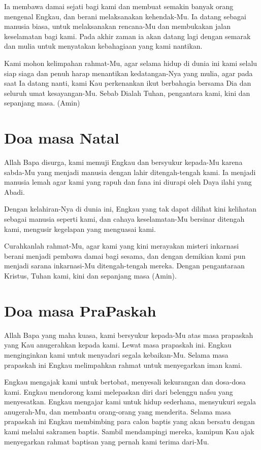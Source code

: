 Ia membawa damai sejati bagi kami dan membuat semakin banyak orang
mengenal Engkau, dan berani melaksanakan kehendak-Mu. Ia datang sebagai
manusia biasa, untuk melaksanakan rencana-Mu dan membukakan jalan
keselamatan bagi kami. Pada akhir zaman ia akan datang lagi dengan
semarak dan mulia untuk menyatakan kebahagiaan yang kami nantikan.

Kami mohon kelimpahan rahmat-Mu, agar selama hidup di dunia ini kami
selalu siap siaga dan penuh harap menantikan kedatangan-Nya yang mulia,
agar pada saat Ia datang nanti, kami Kau perkenankan ikut berbahagia
bersama Dia dan seluruh umat kesayangan-Mu. Sebab Dialah Tuhan,
pengantara kami, kini dan sepanjang masa. (Amin)

\section[Doa masa Natal]{Doa masa Natal}
Allah Bapa disurga, kami memuji Engkau dan bersyukur kepada-Mu karena
sabda-Mu yang menjadi manusia dengan lahir ditengah-tengah kami. Ia
menjadi manusia lemah agar kami yang rapuh dan fana ini diurapi oleh
Daya ilahi yang Abadi.

Dengan kelahiran-Nya di dunia ini, Engkau yang tak dapat dilihat kini
kelihatan sebagai manusia seperti kami, dan cahaya keselamatan-Mu
bersinar ditengah kami, mengusir kegelapan yang menguasai kami.

Curahkanlah rahmat-Mu, agar kami yang kini merayakan misteri inkarnasi
berani menjadi pembawa damai bagi sesama, dan dengan demikian kami pun
menjadi sarana inkarnasi-Mu ditengah-tengah mereka. Dengan pengantaraan
Kristus, Tuhan kami, kini dan sepanjang masa (Amin).

\section[Doa masa PraPaskah]{Doa masa PraPaskah}
Allah Bapa yang maha kuasa, kami bersyukur kepada-Mu atas masa prapaskah
yang Kau anugerahkan kepada kami. Lewat masa prapaskah ini. Engkau
menginginkan kami untuk menyadari segala kebaikan-Mu. Selama masa
prapaskah ini Engkau melimpahkan rahmat untuk menyegarkan iman kami.

Engkau mengajak kami untuk bertobat, menyesali kekurangan dan dosa-dosa
kami. Engkau mendorong kami melepaskan diri dari belenggu nafsu yang
menyesatkan. Engkau mengajar kami untuk hidup sederhana, mensyukuri
segala anugerah-Mu, dan membantu orang-orang yang menderita. Selama
masa prapaskah ini Engkau membimbing para calon baptis yang akan
bersatu dengan kami melalui sakramen baptis. Sambil mendampingi mereka,
kamipun Kau ajak menyegarkan rahmat baptisan yang pernah kami terima
dari-Mu.

